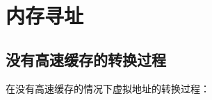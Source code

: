 \chapter{内存寻址}



\paragraph{}
\paragraph{}
\paragraph{}
\paragraph{}
\paragraph{}
\paragraph{}
\paragraph{}
\paragraph{}
\paragraph{}
\paragraph{}











\section{没有高速缓存的转换过程}

在没有高速缓存的情况下虚拟地址的转换过程：

